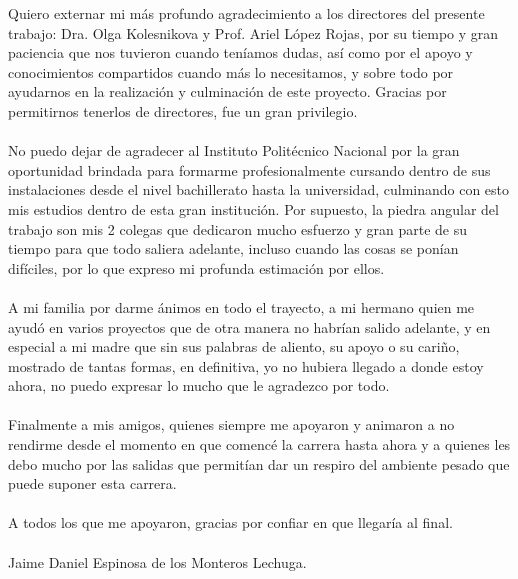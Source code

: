 \documentclass[12pt, a4paper, titlepage]{report}
\begin{document}
\newpage
Quiero externar mi más profundo agradecimiento a los directores del presente trabajo: Dra. Olga Kolesnikova y  Prof. Ariel López Rojas, por su tiempo y gran paciencia que nos tuvieron cuando teníamos dudas, así como por el apoyo y conocimientos compartidos cuando más lo necesitamos, y sobre todo por ayudarnos en la realización y culminación de este proyecto. Gracias por permitirnos tenerlos de directores, fue un gran privilegio.\\\\
No puedo dejar de agradecer al Instituto Politécnico Nacional por la gran oportunidad brindada para formarme profesionalmente  cursando dentro de sus instalaciones desde el nivel bachillerato hasta la universidad, culminando con esto mis estudios dentro de esta gran institución. Por supuesto, la piedra angular del trabajo son mis 2 colegas que dedicaron mucho esfuerzo y gran parte de su tiempo para que todo saliera adelante, incluso cuando las cosas se ponían difíciles, por lo que expreso mi profunda estimación por ellos.\\\\
A mi familia por darme ánimos en todo el trayecto, a mi hermano quien me ayudó en varios proyectos que de otra manera no habrían salido adelante, y en especial a mi madre que sin sus palabras de aliento, su apoyo o su cariño, mostrado de tantas formas, en definitiva, yo no hubiera llegado a donde estoy ahora, no puedo expresar lo mucho que le agradezco por todo.\\\\
Finalmente a mis amigos, quienes siempre me apoyaron y animaron a no rendirme desde el momento en que comencé la carrera hasta ahora y a quienes les debo mucho por las salidas que permitían dar un respiro del ambiente pesado que puede suponer esta carrera.\\\\
A todos los que me apoyaron, gracias por confiar en que llegaría al final.\\\\

Jaime Daniel Espinosa de los Monteros Lechuga.
\renewcommand\appendixpagename{Índice}
\renewcommand\appendixtocname{Índice}
\appendixpageoff
	\begin{appendices}
		\renewcommand*\contentsname{{\textcolor{azulescom}{Índice.}}}
		\tableofcontents
		\newpage
		\renewcommand*\listfigurename{{\textcolor{azulescom}{Índice de figuras.}}}
		\listoffigures
		\newpage
		\newpage
		\renewcommand*\listtablename{{\textcolor{azulescom}{Índice de cuadros.}}}
		\listoftables
	\end{appendices}
    
\end{document}
